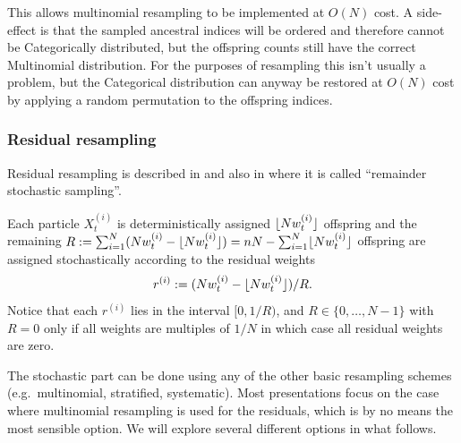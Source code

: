 This allows multinomial resampling to be implemented at $O(N)$ cost. 
A side-effect is that the sampled ancestral indices will be ordered and therefore cannot be Categorically distributed, but the offspring counts still have the correct Multinomial distribution. For the purposes of resampling this isn't usually a problem, but the Categorical distribution can anyway be restored at $O(N)$ cost by applying a random permutation to the offspring indices.




\subsubsection{Residual resampling}
Residual resampling is described in \textcite{liu1998} and also in \textcite{whitley1994} where it is called ``remainder stochastic sampling''.

Each particle $X_{t}^{(i)}$ is deterministically assigned $\lfloor N w_t^{(i)} \rfloor$ offspring and the remaining $R := \sum_{i=1}^N ( Nw_t^{(i)} - \lfloor N w_t^{(i)} \rfloor) = n                           N- \sum_{i=1}^N \lfloor N w_t^{(i)} \rfloor$ offspring are assigned stochastically according to the residual weights
\begin{equation*}
r^{(i)} := ( Nw_t^{(i)} - \lfloor N w_t^{(i)} \rfloor) /R .
\end{equation*}
Notice that each $r^{(i)}$ lies in the interval $[0, 1/R)$, and $R\in\{0,\dots,N-1\}$ with $R=0$ only if all weights are multiples of $1/N$ in which case all residual weights are zero.

The stochastic part can be done using any of the other basic resampling schemes (e.g.\ multinomial, stratified, systematic). Most presentations focus on the case where multinomial resampling is used for the residuals, which is by no means the most sensible option. We will explore several different options in what follows.




